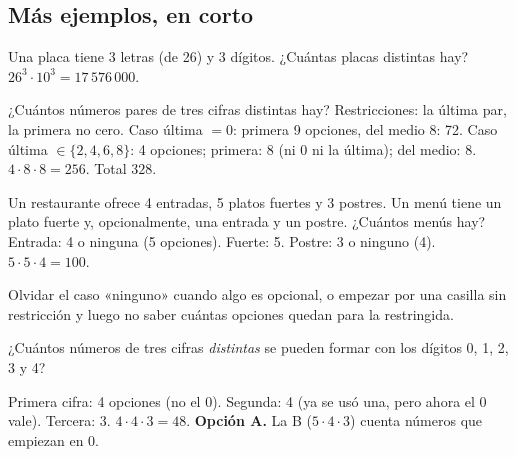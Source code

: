 \subsection{Más ejemplos, en corto}
\begin{ejemplo}[Placas]
Una placa tiene 3 letras (de 26) y 3 dígitos. ¿Cuántas placas distintas hay?
\solucion $26^3 \cdot 10^3 = 17\,576\,000$.
\end{ejemplo}

\begin{ejemplo}
¿Cuántos números pares de tres cifras distintas hay?
\solucion Restricciones: la última par, la primera no cero. Caso última $= 0$: primera 9 opciones, del medio 8: 72. Caso
última $\in \{2, 4, 6, 8\}$: 4 opciones; primera: 8 (ni 0 ni la última); del medio: 8. $4 \cdot 8 \cdot 8 = 256$. Total
$328$.
\end{ejemplo}

\begin{ejemplo}[Menú]
Un restaurante ofrece 4 entradas, 5 platos fuertes y 3 postres. Un menú tiene un plato fuerte y, opcionalmente, una entrada
y un postre. ¿Cuántos menús hay?
\solucion Entrada: 4 o ninguna (5 opciones). Fuerte: 5. Postre: 3 o ninguno (4). $5 \cdot 5 \cdot 4 = 100$.
\end{ejemplo}

\begin{trampa}
Olvidar el caso «ninguno» cuando algo es opcional, o empezar por una casilla sin restricción y luego no saber cuántas
opciones quedan para la restringida.
\end{trampa}

\begin{reto}
¿Cuántos números de tres cifras \emph{distintas} se pueden formar con los dígitos 0, 1, 2, 3 y 4?
\end{reto}

\begin{retoresuelto}
Primera cifra: 4 opciones (no el 0). Segunda: 4 (ya se usó una, pero ahora el 0 vale). Tercera: 3. $4 \cdot 4 \cdot 3 =
48$. \textbf{Opción A.} La B ($5 \cdot 4 \cdot 3$) cuenta números que empiezan en 0.
\end{retoresuelto}

